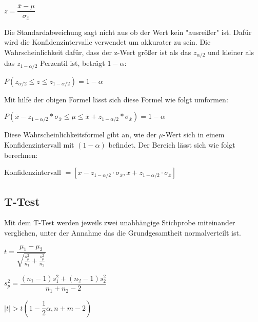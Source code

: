 \begin{center}
  $z = \dfrac{\overline{x} - \mu}{\sigma_{\overline{x}}}$
\end{center}

Die Standardabweichung sagt nicht aus ob der Wert kein "ausreißer" ist. Dafür wird die Konfidenzintervalle verwendet
um akkurater zu sein.
Die Wahrscheinlichkeit dafür, dass der z-Wert
größer ist als das $z_{\alpha/2}$ und kleiner
als das $z_{1-\alpha/2}$ Perzentil ist, beträgt $1 - \alpha$:

\begin{center}
  $P(z_{\alpha/2} \leq z \leq z_{1-\alpha/2}) = 1 - \alpha$
\end{center}

Mit hilfe der obigen Formel lässt sich diese Formel wie folgt umformen:

\begin{center}
  $P(\overline{x} - z_{1-\alpha/2} * \sigma_{\overline{x}} \leq \mu \leq \overline{x} + z_{1-\alpha/2} * \sigma_{\overline{x}}) = 1 - \alpha$
\end{center}

Diese Wahrscheinlichkeitsformel gibt an, wie der $\mu$-Wert sich in einem Konfidenzintervall mit $(1 - \alpha)$ befindet.
Der Bereich lässt sich wie folgt berechnen:

\begin{center}
  Konfidenzintervall $= [\overline{x} - z_{1-\alpha / 2} \cdot \sigma_{\overline{x}}, \overline{x} + z_{1-\alpha / 2} \cdot \sigma_{\overline{x}}]$
\end{center}

\subsection{T-Test}
Mit dem T-Test werden jeweils zwei unabhängige Stichprobe miteinander verglichen, 
unter der Annahme das die Grundgesamtheit normalverteilt ist.

\begin{center}
  $t = \dfrac{\mu_1-\mu_2}{\sqrt{\frac{s_p^2}{n_1} + \frac{s_p^2}{n_2}}}$
\end{center}

\begin{center}
  $s^2_p = \dfrac{(n_1 - 1)s^2_1 + (n_2 - 1)s^2_2}{n_1 + n_2 - 2}$
\end{center}

\begin{center}
  $|t| > t(1 - \dfrac{1}{2}\alpha, n + m - 2)$
\end{center}

